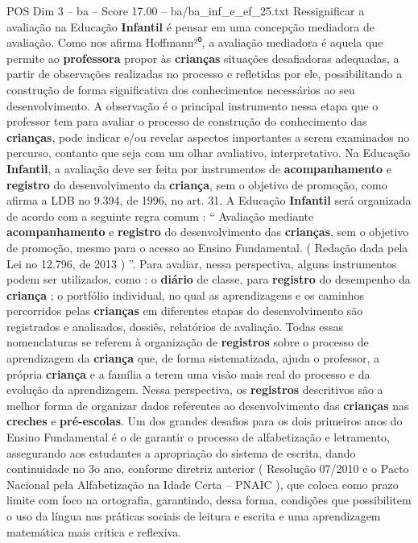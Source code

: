 \begin{textsample}{POS Dim 3 – ba – Score 17.00 – ba/ba\_inf\_e\_ef\_25.txt}
Ressignificar a avaliação na Educação \textbf{Infantil} é pensar em uma concepção mediadora de avaliação.
Como nos afirma Hoffmann²⁰, a avaliação mediadora é aquela que permite ao \textbf{professora} propor às \textbf{crianças} situações desafiadoras adequadas, a partir de observações realizadas no processo e refletidas por ele, possibilitando a construção de forma significativa dos conhecimentos necessários ao seu desenvolvimento.
A observação é o principal instrumento nessa etapa que o professor tem para avaliar o processo de construção do conhecimento das \textbf{crianças}, pode indicar e/ou revelar aspectos importantes a serem examinados no percurso, contanto que seja com um olhar avaliativo, interpretativo.
Na Educação \textbf{Infantil}, a avaliação deve ser feita por instrumentos de \textbf{acompanhamento} e \textbf{registro} do desenvolvimento da \textbf{criança}, sem o objetivo de promoção, como afirma a LDB no 9.394, de 1996, no art. 31.
A Educação \textbf{Infantil} será organizada de acordo com a seguinte regra comum : “ Avaliação mediante \textbf{acompanhamento} e \textbf{registro} do desenvolvimento das \textbf{crianças}, sem o objetivo de promoção, mesmo para o acesso ao Ensino Fundamental. ( Redação dada pela Lei no 12.796, de 2013 ) ”.
Para avaliar, nessa perspectiva, alguns instrumentos podem ser utilizados, como : o \textbf{diário} de classe, para \textbf{registro} do desempenho da \textbf{criança} ; o portfólio individual, no qual as aprendizagens e os caminhos percorridos pelas \textbf{crianças} em diferentes etapas do desenvolvimento são registrados e analisados, dossiês, relatórios de avaliação.
Todas essas nomenclaturas se referem à organização de \textbf{registros} sobre o processo de aprendizagem da \textbf{criança} que, de forma sistematizada, ajuda o professor, a própria \textbf{criança} e a família a terem uma visão mais real do processo e da evolução da aprendizagem.
Nessa perspectiva, os \textbf{registros} descritivos são a melhor forma de organizar dados referentes ao desenvolvimento das \textbf{crianças} nas \textbf{creches} e \textbf{pré-escolas}.
Um dos grandes desafios para os dois primeiros anos do Ensino Fundamental é o de garantir o processo de alfabetização e letramento, assegurando aos estudantes a apropriação do sistema de escrita, dando continuidade no 3o ano, conforme diretriz anterior ( Resolução 07/2010 e o Pacto Nacional pela Alfabetização na Idade Certa – PNAIC ), que coloca como prazo limite com foco na ortografia, garantindo, dessa forma, condições que possibilitem o uso da língua nas práticas sociais de leitura e escrita e uma aprendizagem matemática mais crítica e reflexiva.

\end{textsample}
